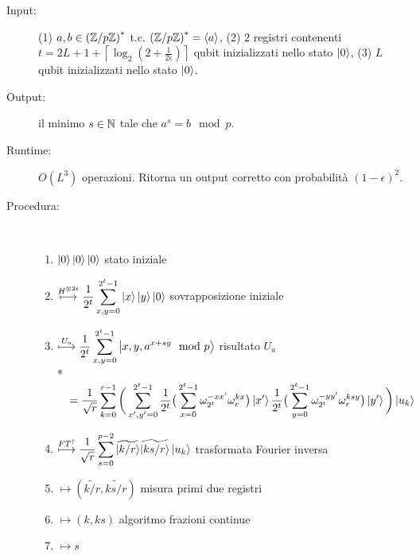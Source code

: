 \begin{algo}\*
\begin{description}
  \item [Input:] (1) $a,b \in \left(\mathbb{Z}/{p}\mathbb{Z}\right)^*$ t.c. $\left(\mathbb{Z}/{p}\mathbb{Z}\right)^* = \langle a \rangle$, (2) $2$ registri contenenti $t = 2L + 1 + {\left\lceil \log_2 \left(2 + \frac{1}{2\epsilon} \right) \right\rceil}$ qubit inizializzati nello stato $\ket{0}$, (3) $L$ qubit inizializzati nello stato $\ket{0}$.
  \item [Output:] il minimo $s \in \mathbb{N}$ tale che $a^s = b \mod p$.
  \item [Runtime:] $O(L^3)$ operazioni. Ritorna un output corretto con probabilità $\left(1-\epsilon\right)^2$.
  \newpage
  \item [Procedura:] \ 
    \begin{enumerate}
     \item ${\displaystyle\ket{0}\ket{0}\ket{0}}$
     \hfill {\small stato iniziale}
     \item ${\displaystyle\stackrel{H^{\otimes 2t}}{\longmapsto} \frac{1}{2^t} \sum_{x,y=0}^{2^t-1} \ket{x}\ket{y}\ket{0}}$
     \hfill {\small sovrapposizione iniziale}
     \item ${\displaystyle\stackrel{U_a}{\longmapsto} \frac{1}{2^t} \sum_{x,y = 0}^{2^t-1} \ket{x,y,a^{x+sy} \mod p}}$
     \hfill {\small risultato $U_a$}\\*
     \ \ ${\displaystyle\quad = \frac{1}{\sqrt{r}}\sum_{k=0}^{r-1} \bigg(\sum_{x',y' = 0}^{2^t-1}
     \frac{1}{2^t}\big(\sum_{x = 0}^{2^t-1} \omega_{2^t}^{-xx'}\omega_{r}^{kx} \big) \ket{x'}
     \frac{1}{2^t}\big(\sum_{y = 0}^{2^t-1} \omega_{2^t}^{-yy'}\omega_{r}^{ksy}\big) \ket{y'}\bigg) \ket{u_k}}$
     \item ${\displaystyle\stackrel{FT^\dag}{\longmapsto} \frac{1}{\sqrt{r}}\sum_{s=0}^{p-2} \widetilde{\ket{k/r}}\widetilde{\ket{ks/r}}\ket{u_k}}$
     \hfill {\small trasformata Fourier inversa}
     \item ${\displaystyle\longmapsto \left(\widetilde{k/r},\widetilde{ks/r}\right)}$
     \hfill {\small misura primi due registri}
     \item ${\displaystyle\longmapsto \left(k,ks\right)}$
     \hfill {\small algoritmo frazioni continue}
     \item ${\displaystyle\longmapsto s}$
    \end{enumerate}
 \end{description}
\end{algo}
